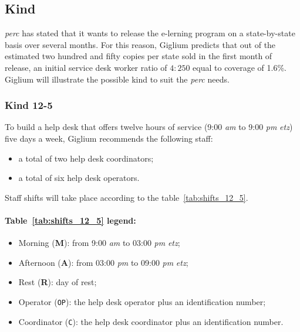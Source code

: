 \subsection{Kind}
\textit{\gls{perc}} has stated that it wants to release the e-lerning program on a state-by-state basis over several months. For this reason, Giglium predicts that out of the estimated two hundred and fifty copies per state sold in the first month of release, an initial service desk worker ratio of $4:250$ equal to coverage of 1.6\%. Giglium will illustrate the possible kind to suit the \textit{\gls{perc}} needs.

\subsubsection{Kind 12{-}5}\label{12_5}
To build a help desk that offers twelve hours of service (9:00 \textit{\gls{am}} to 9:00 \textit{\gls{pm}} \textit{\gls{etz}}) five days a week, Giglium recommends the following staff:
\begin{itemize}
	\item a total of two help desk coordinators;
	\item a total of six help desk operators.
\end{itemize}

\noindent Staff shifts will take place according to the table~\ref{tab:shifts_12_5}.

\paragraph{Table~\ref{tab:shifts_12_5} legend:}
\begin{itemize}
	\item Morning (\textbf{M}): from 9:00 \textit{\gls{am}} to 03:00 \textit{\gls{pm}} \textit{\gls{etz}};
	\item Afternoon (\textbf{A}): from 03:00 \textit{\gls{pm}} to 09:00 \textit{\gls{pm}} \textit{\gls{etz}};
	\item Rest (\textbf{R}): day of rest;
	\item Operator (\texttt{OP}): the help desk operator plus an identification number;
	\item Coordinator (\texttt{C}): the help desk coordinator plus an identification number.
\end{itemize}

